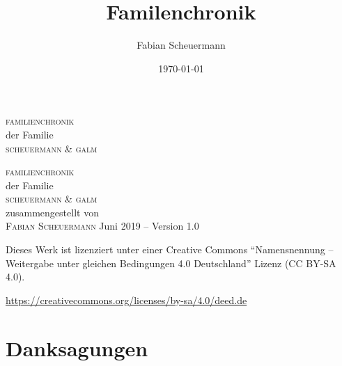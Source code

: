 \documentclass[
    paper    = a4,
    fontsize = 12pt,
    BCOR     = 5mm,
    twoside  = true,
    DIV      = 12,
    open     = right,
    ]{scrreprt}
\author{Fabian Scheuermann}
\title{Familenchronik}
\date{\today}
\begin{document}

\thispagestyle{empty}

\begin{center}
    \large
    {\normalfont\color{Maroon}\Large\scshape\lsstyle familienchronik} \\ \bigskip
    {der Familie} \\ \bigskip    
    {\normalfont\color{Maroon}\Large\scshape\lsstyle scheuermann \& galm}\\ 
\end{center}        

\begin{titlepage}
    \begin{center}
        \large
        \hfill
        \vfill
        {\normalfont\color{Maroon}\Large\scshape\lsstyle familienchronik} \\ \bigskip
        {der Familie} \\ \bigskip    
        {\normalfont\color{Maroon}\Large\scshape\lsstyle scheuermann \& galm}\\ 
        \vfill
        {zusammengestellt von} \\ \medskip
        {\scshape \lsstyle Fabian Scheuermann}
        \vfill
        Juni 2019 -- Version 1.0
        \vfill                      

    \end{center}  
\end{titlepage}   

\thispagestyle{empty}

\hfill

\vfill

\begin{addmargin}[-0.5em]{-0.5em}
\noindent Dieses Werk ist lizenziert unter einer Creative Commons \enquote{Namensnennung -- Weitergabe unter gleichen Bedingungen 4.0 Deutschland} Lizenz (CC BY-SA 4.0).
\end{addmargin}
\begin{center}
    \url{https://creativecommons.org/licenses/by-sa/4.0/deed.de}
\end{center}

\chapter*{Danksagungen}
\end{document}

